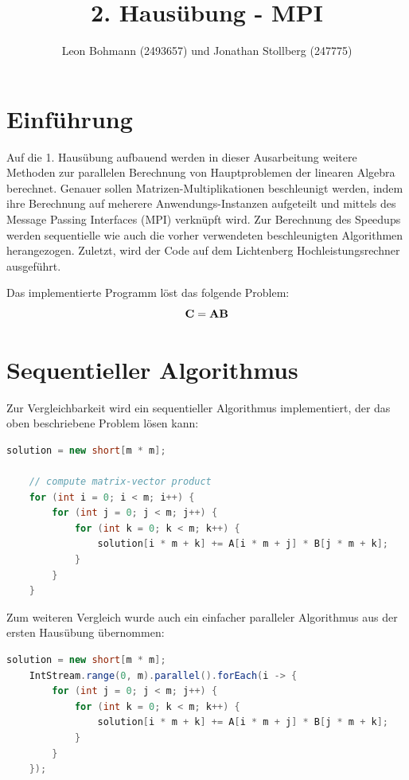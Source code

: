 \documentclass[
ngerman,
ruledheaders=section,
class=report,
thesis={type=Dokumentation},
ignore-missing-data=true,
accentcolor=9c,
custommargins=false,
marginpar=false,
parskip=half-,
fontsize=11pt,
]{tudapub}
\begin{document}
	
	
	\title{2. Hausübung - MPI}
	\author[]{Leon Bohmann (2493657) und Jonathan Stollberg (247775)}
	\submissiondate{\today}
	
	\maketitle
	\tableofcontents
	
	\chapter{Einführung}
	Auf die 1. Hausübung aufbauend werden in dieser Ausarbeitung weitere Methoden zur parallelen Berechnung von Hauptproblemen der linearen Algebra berechnet. Genauer sollen Matrizen-Multiplikationen beschleunigt werden, indem ihre Berechnung auf meherere Anwendungs-Instanzen aufgeteilt und mittels des Message Passing Interfaces (MPI) verknüpft wird. Zur Berechnung des Speedups werden sequentielle wie auch die vorher verwendeten beschleunigten Algorithmen herangezogen. Zuletzt, wird der Code auf dem Lichtenberg Hochleistungsrechner ausgeführt.
	
	Das implementierte Programm löst das folgende Problem:
	\begin{equation}
		\text{\textbf{C}}=\text{\textbf{A}}\text{\textbf{B}}
	\end{equation}
	
	\chapter{Sequentieller Algorithmus}
	Zur Vergleichbarkeit wird ein sequentieller Algorithmus implementiert, der das oben beschriebene Problem lösen kann:
	
	\begin{lstlisting}[language=java,label=alg_sequential,caption={Sequentieller Algorithmus zur Berechnung Matrix-Matrix-Produkte}]
   	solution = new short[m * m];
	
	// compute matrix-vector product
	for (int i = 0; i < m; i++) {
		for (int j = 0; j < m; j++) {
			for (int k = 0; k < m; k++) {
				solution[i * m + k] += A[i * m + j] * B[j * m + k];
			}
		}
	}
	\end{lstlisting}
	
	Zum weiteren Vergleich wurde auch ein einfacher paralleler Algorithmus aus der ersten Hausübung übernommen:
	\begin{lstlisting}[language=java,label=alg_parallel_stream,caption={Paralleler Algorithmus mit Streams-API}]			
	solution = new short[m * m];
	IntStream.range(0, m).parallel().forEach(i -> {
		for (int j = 0; j < m; j++) {
			for (int k = 0; k < m; k++) {
				solution[i * m + k] += A[i * m + j] * B[j * m + k];
			}
		}
	});
	\end{lstlisting}
	
\end{document}
